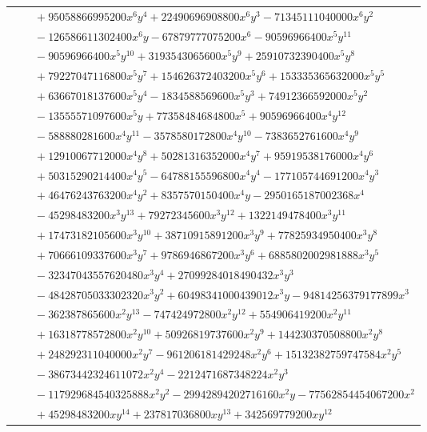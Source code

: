 \documentclass[11pt]{article}
\begin{document}
\begin{longtable}{@{}ll@{}}
 & $\quad +95058866995200x^{6}y^{4}+22490696908800x^{6}y^{3}-71345111040000x^{6}y^{2}$\\
 & $\quad -126586611302400x^{6}y-67879777075200x^{6}-90596966400x^{5}y^{11}$\\
 & $\quad -90596966400x^{5}y^{10}+3193543065600x^{5}y^{9}+25910732390400x^{5}y^{8}$\\
 & $\quad +79227047116800x^{5}y^{7}+154626372403200x^{5}y^{6}+153335365632000x^{5}y^{5}$\\
 & $\quad +63667018137600x^{5}y^{4}-1834588569600x^{5}y^{3}+74912366592000x^{5}y^{2}$\\
 & $\quad -13555571097600x^{5}y+77358484684800x^{5}+90596966400x^{4}y^{12}$\\
 & $\quad -588880281600x^{4}y^{11}-3578580172800x^{4}y^{10}-7383652761600x^{4}y^{9}$\\
 & $\quad +12910067712000x^{4}y^{8}+50281316352000x^{4}y^{7}+95919538176000x^{4}y^{6}$\\
 & $\quad +50315290214400x^{4}y^{5}-64788155596800x^{4}y^{4}-177105744691200x^{4}y^{3}$\\
 & $\quad +46476243763200x^{4}y^{2}+8357570150400x^{4}y-2950165187002368x^{4}$\\
 & $\quad -45298483200x^{3}y^{13}+79272345600x^{3}y^{12}+1322149478400x^{3}y^{11}$\\
 & $\quad +17473182105600x^{3}y^{10}+38710915891200x^{3}y^{9}+77825934950400x^{3}y^{8}$\\
 & $\quad +70666109337600x^{3}y^{7}+9786946867200x^{3}y^{6}+6885802002981888x^{3}y^{5}$\\
 & $\quad -32347043557620480x^{3}y^{4}+27099284018490432x^{3}y^{3}$\\
 & $\quad -48428705033302320x^{3}y^{2}+60498341000439012x^{3}y-94814256379177899x^{3}$\\
 & $\quad -362387865600x^{2}y^{13}-747424972800x^{2}y^{12}+554906419200x^{2}y^{11}$\\
 & $\quad +16318778572800x^{2}y^{10}+50926819737600x^{2}y^{9}+144230370508800x^{2}y^{8}$\\
 & $\quad +248292311040000x^{2}y^{7}-961206181429248x^{2}y^{6}+15132382759747584x^{2}y^{5}$\\
 & $\quad -38673442324611072x^{2}y^{4}-2212471687348224x^{2}y^{3}$\\
 & $\quad -117929684540325888x^{2}y^{2}-29942894202716160x^{2}y-77562854454067200x^{2}$\\
 & $\quad +45298483200xy^{14}+237817036800xy^{13}+342569779200xy^{12}$\\

\end{longtable}
\end{document}
